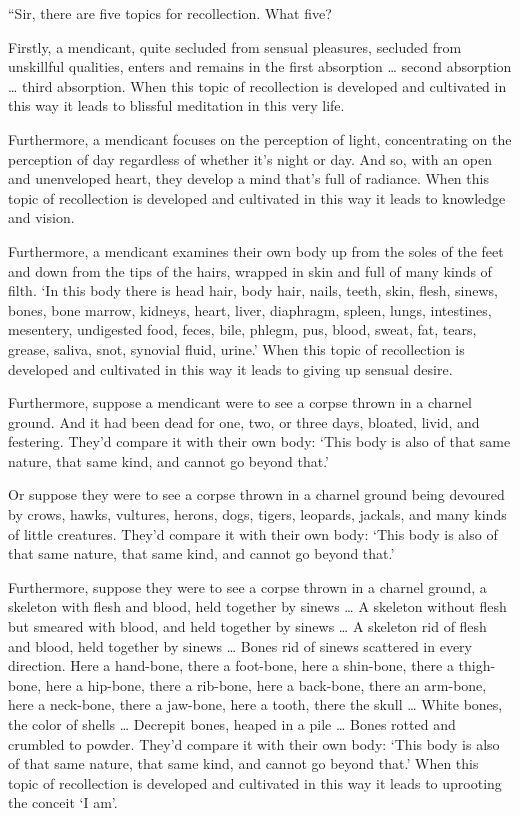 \documentclass[12pt,openany]{book}%
\begin{document}
“Sir, there are five topics for recollection. What five? 

Firstly, a mendicant, quite secluded from sensual pleasures, secluded from unskillful qualities, enters and remains in the first absorption … second absorption … third absorption. When this topic of recollection is developed and cultivated in this way it leads to blissful meditation in this very life. 

Furthermore, a mendicant focuses on the perception of light, concentrating on the perception of day regardless of whether it’s night or day. And so, with an open and unenveloped heart, they develop a mind that’s full of radiance. When this topic of recollection is developed and cultivated in this way it leads to knowledge and vision. 

Furthermore, a mendicant examines their own body up from the soles of the feet and down from the tips of the hairs, wrapped in skin and full of many kinds of filth. ‘In this body there is head hair, body hair, nails, teeth, skin, flesh, sinews, bones, bone marrow, kidneys, heart, liver, diaphragm, spleen, lungs, intestines, mesentery, undigested food, feces, bile, phlegm, pus, blood, sweat, fat, tears, grease, saliva, snot, synovial fluid, urine.’ When this topic of recollection is developed and cultivated in this way it leads to giving up sensual desire. 

Furthermore, suppose a mendicant were to see a corpse thrown in a charnel ground. And it had been dead for one, two, or three days, bloated, livid, and festering. They’d compare it with their own body: ‘This body is also of that same nature, that same kind, and cannot go beyond that.’ 

Or suppose they were to see a corpse thrown in a charnel ground being devoured by crows, hawks, vultures, herons, dogs, tigers, leopards, jackals, and many kinds of little creatures. They’d compare it with their own body: ‘This body is also of that same nature, that same kind, and cannot go beyond that.’ 

Furthermore, suppose they were to see a corpse thrown in a charnel ground, a skeleton with flesh and blood, held together by sinews … A skeleton without flesh but smeared with blood, and held together by sinews … A skeleton rid of flesh and blood, held together by sinews … Bones rid of sinews scattered in every direction. Here a hand-bone, there a foot-bone, here a shin-bone, there a thigh-bone, here a hip-bone, there a rib-bone, here a back-bone, there an arm-bone, here a neck-bone, there a jaw-bone, here a tooth, there the skull … White bones, the color of shells … Decrepit bones, heaped in a pile … Bones rotted and crumbled to powder. They’d compare it with their own body: ‘This body is also of that same nature, that same kind, and cannot go beyond that.’ When this topic of recollection is developed and cultivated in this way it leads to uprooting the conceit ‘I am’. 
\end{document}
